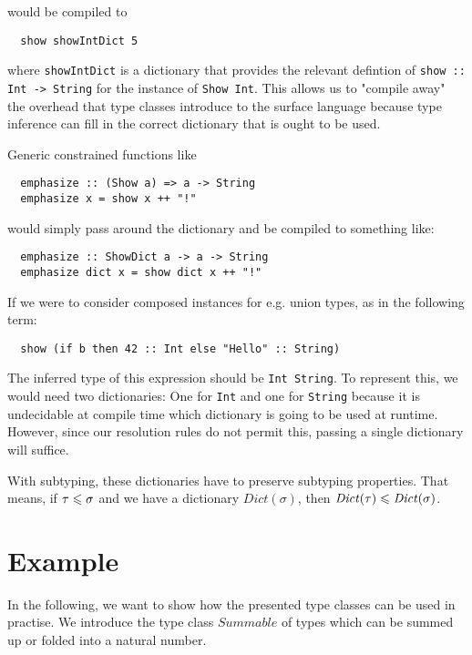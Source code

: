would be compiled to

\begin{verbatim}
  show showIntDict 5
\end{verbatim}

where \texttt{showIntDict} is a dictionary that provides the relevant defintion of \texttt{show :: Int -> String} for the instance of \texttt{Show Int}.
This allows us to "compile away" the overhead that type classes introduce to the surface language because type inference can fill in the correct dictionary that is ought to be used.

Generic constrained functions like

\begin{verbatim}
  emphasize :: (Show a) => a -> String
  emphasize x = show x ++ "!"
\end{verbatim}

would simply pass around the dictionary and be compiled to something like:

\begin{verbatim}
  emphasize :: ShowDict a -> a -> String
  emphasize dict x = show dict x ++ "!"
\end{verbatim}

If we were to consider composed instances for e.g. union types, as in the following term:

\begin{verbatim}
  show (if b then 42 :: Int else "Hello" :: String)
\end{verbatim}

The inferred type of this expression should be \texttt{Int \/ String}.
To represent this, we would need two dictionaries: One for \texttt{Int} and one for \texttt{String} because it is undecidable at compile time which dictionary is going to be used at runtime.
However, since our resolution rules do not permit this, passing a single dictionary will suffice.

With subtyping, these dictionaries have to preserve subtyping properties.
That means, if $\tau \leqslant \sigma$ and we have a dictionary $\mathit{Dict}(\sigma)$, then $\mathit{Dict}(\tau) \leqslant \mathit{Dict}(\sigma)$.


\section{Example}

In the following, we want to show how the presented type classes can be used in practise.
We introduce the type class $\mathit{Summable}$ of types which can be summed up or folded into a natural number.

